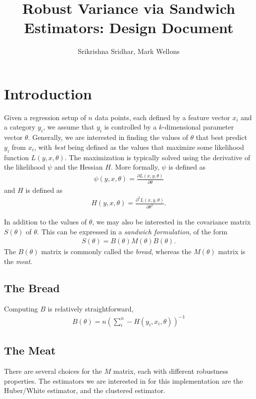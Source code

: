 \documentclass[12pt]{article}
\author{Srikrishna Sridhar, Mark Wellons}
\title{Robust Variance via Sandwich Estimators: Design Document}
\begin{document}
\maketitle

\section{Introduction}
Given a regression setup of $n$ data points, each defined by a feature  vector $x_i$ and a category $y_i$, we assume that $y_i$ is controlled by a $k$-dimensional parameter vector $\theta$.  Generally, we are interested in finding the values of $\theta$ that best predict $y_i$ from $x_i$, with \textit{best} being defined as the values that maximize some likelihood function $L(y,x,\theta)$.  The maximization is typically solved using the derivative of the likelihood $\psi$  and the Hessian $H$.  More formally, $\psi$ is defined as 
\begin{align}
\psi(y,x, \theta) = \frac{\partial L(x,y,\theta)}{\partial \theta}
\end{align} 
and $H$ is defined as
\begin{align}
H(y,x, \theta) = \frac{\partial^2 L(x,y,\theta)}{\partial \theta^2}.
\end{align} 



In addition to the values of $\theta$, we may also be interested in the covariance matrix $S(\theta)$ of $\theta$.  This can be expressed in a \textit{sandwich formulation}, of the form
\begin{align}
S(\theta) = B(\theta) M(\theta) B(\theta).  
\end{align}
The $B(\theta)$ matrix is commonly called the \textit{bread}, whereas the $M(\theta)$ matrix is the \textit{meat}.  

\subsection{The Bread}
Computing $B$ is relatively straightforward, 
\begin{align}
B(\theta) = n\left(\sum_i^n -H(y_i, x_i, \theta) \right)^{-1}
\end{align}

\subsection{The Meat}
There are several choices for the $M$ matrix, each with different robustness properties.  The estimators we are interested in for this implementation are the Huber/White estimator, and the clustered estimator.  
\end{document}
